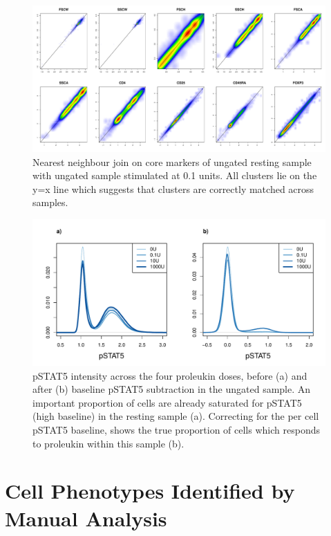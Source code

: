 \hspace{-2cm}
\begin{figure}[h]
\centering
\includegraphics[scale=.3]{IL2/figures/ann-join-0U-01U.pdf}
{Nearest neighbour join on core markers of ungated resting sample with ungated sample stimulated at 0.1 units. }
{
All clusters lie on the y=x line which suggests that clusters are correctly matched across samples.
}
\end{figure}


\hspace{-2cm}
\begin{figure}[h]
\centering
\includegraphics[scale=.5]{IL2/figures/pstat5-baseline-relative.pdf}
{ pSTAT5 intensity across the four proleukin doses, before (a) and after (b) baseline pSTAT5 subtraction in the ungated sample.}
{
  An important proportion of cells are already saturated for pSTAT5 (high baseline) in the resting sample (a).
  Correcting for the per cell pSTAT5 baseline, shows the true proportion of cells which responds to proleukin within this sample (b).
}
\end{figure}




\section{Cell Phenotypes Identified by Manual Analysis}


